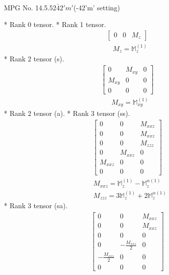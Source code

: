 \documentclass[fleqn,8pt,landscape]{jsarticle}
\begin{document}
\setcounter{MaxMatrixCols}{32}

\renewcommand{\tablename}{Table~}
\renewcommand{\figurename}{Figure~}
\begin{center}
\LARGE
MPG No. 14.5.52\quad$\bar{4}2'm'$\quad(-42'm' setting)
\end{center}
* Rank 0 tensor.
* Rank 1 tensor.
\begin{align*}
\begin{bmatrix} 0 & 0 & M_{z} \end{bmatrix}
\end{align*}
\begin{align*}
& M_{z} = \mathbb{M}_{z}^{(1)}
\end{align*}
* Rank 2 tensor (s).
\begin{align*}
\begin{bmatrix} 0 & M_{xy} & 0 \\ M_{xy} & 0 & 0 \\ 0 & 0 & 0 \end{bmatrix}
\end{align*}
\begin{align*}
& M_{xy} = \mathbb{M}_{xy}^{(1)}
\end{align*}
* Rank 2 tensor (a).
* Rank 3 tensor (ss).
\begin{align*}
\begin{bmatrix} 0 & 0 & M_{xxz} \\ 0 & 0 & M_{xxz} \\ 0 & 0 & M_{zzz} \\ 0 & M_{xxz} & 0 \\ M_{xxz} & 0 & 0 \\ 0 & 0 & 0 \end{bmatrix}
\end{align*}
\begin{align*}
& M_{xxz} = \mathbb{M}_{z}^{(1)} - \mathbb{M}_{z}^{\alpha(1)} \\
& M_{zzz} = 3 \mathbb{M}_{z}^{(1)} + 2 \mathbb{M}_{z}^{\alpha(1)}
\end{align*}
* Rank 3 tensor (sa).
\begin{align*}
\begin{bmatrix} 0 & 0 & M_{xxz} \\ 0 & 0 & M_{xxz} \\ 0 & 0 & 0 \\ 0 & - \frac{M_{xxz}}{2} & 0 \\ - \frac{M_{xxz}}{2} & 0 & 0 \\ 0 & 0 & 0 \end{bmatrix}
\end{align*}
\end{document}
